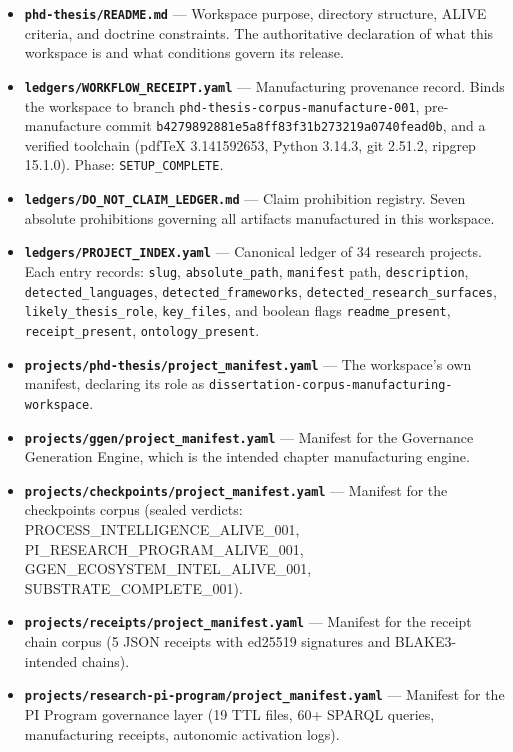 \begin{itemize}
  \item \textbf{\texttt{phd-thesis/README.md}} --- Workspace purpose, directory structure,
    ALIVE criteria, and doctrine constraints. The authoritative declaration of what this
    workspace is and what conditions govern its release.

  \item \textbf{\texttt{ledgers/WORKFLOW\_RECEIPT.yaml}} --- Manufacturing provenance record.
    Binds the workspace to branch \texttt{phd-thesis-corpus-manufacture-001}, pre-manufacture
    commit \texttt{b4279892881e5a8ff83f31b273219a0740fead0b}, and a verified toolchain
    (pdfTeX 3.141592653, Python 3.14.3, git 2.51.2, ripgrep 15.1.0). Phase:
    \texttt{SETUP\_COMPLETE}.

  \item \textbf{\texttt{ledgers/DO\_NOT\_CLAIM\_LEDGER.md}} --- Claim prohibition registry.
    Seven absolute prohibitions governing all artifacts manufactured in this workspace.

  \item \textbf{\texttt{ledgers/PROJECT\_INDEX.yaml}} --- Canonical ledger of 34 research
    projects. Each entry records: \texttt{slug}, \texttt{absolute\_path},
    \texttt{manifest} path, \texttt{description}, \texttt{detected\_languages},
    \texttt{detected\_frameworks}, \texttt{detected\_research\_surfaces},
    \texttt{likely\_thesis\_role}, \texttt{key\_files}, and boolean flags
    \texttt{readme\_present}, \texttt{receipt\_present}, \texttt{ontology\_present}.

  \item \textbf{\texttt{projects/phd-thesis/project\_manifest.yaml}} --- The workspace's
    own manifest, declaring its role as \texttt{dissertation-corpus-manufacturing-workspace}.

  \item \textbf{\texttt{projects/ggen/project\_manifest.yaml}} --- Manifest for the
    Governance Generation Engine, which is the intended chapter manufacturing engine.

  \item \textbf{\texttt{projects/checkpoints/project\_manifest.yaml}} --- Manifest for the
    checkpoints corpus (sealed verdicts: PROCESS\_INTELLIGENCE\_ALIVE\_001,
    PI\_RESEARCH\_PROGRAM\_ALIVE\_001, GGEN\_ECOSYSTEM\_INTEL\_ALIVE\_001,
    SUBSTRATE\_COMPLETE\_001).

  \item \textbf{\texttt{projects/receipts/project\_manifest.yaml}} --- Manifest for the
    receipt chain corpus (5 JSON receipts with ed25519 signatures and BLAKE3-intended chains).

  \item \textbf{\texttt{projects/research-pi-program/project\_manifest.yaml}} --- Manifest
    for the PI Program governance layer (19 TTL files, 60+ SPARQL queries, manufacturing
    receipts, autonomic activation logs).
\end{itemize}

